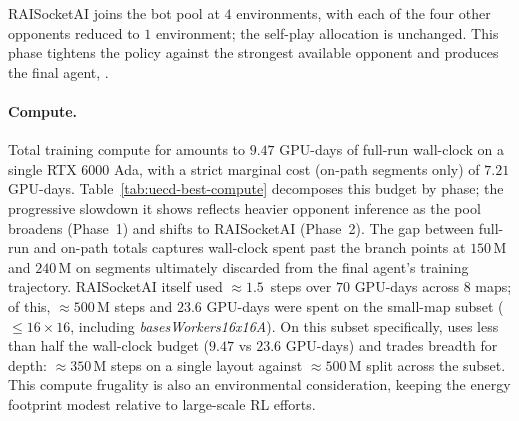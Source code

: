 RAISocketAI joins the bot pool at $4$ environments, with each of the four other opponents reduced to $1$ environment; the self-play allocation is unchanged. This phase tightens the policy against the strongest available opponent and produces the final agent, .

\paragraph{Compute.}

Total training compute for  amounts to $9.47$ GPU-days of full-run wall-clock on a single RTX 6000 Ada, with a strict marginal cost (on-path segments only) of $7.21$ GPU-days. Table~\ref{tab:uecd-best-compute} decomposes this budget by phase; the progressive slowdown it shows reflects heavier opponent inference as the pool broadens (Phase~1) and shifts to RAISocketAI (Phase~2). The gap between full-run and on-path totals captures wall-clock spent past the branch points at $150\,\text{M}$ and $240\,\text{M}$ on segments ultimately discarded from the final agent's training trajectory. RAISocketAI itself used ${\approx}1.5$\, steps over $70$ GPU-days across $8$ maps; of this, ${\approx}500\,\text{M}$ steps and $23.6$ GPU-days were spent on the small-map subset ($\le\!16{\times}16$, including \emph{basesWorkers16x16A}). On this subset specifically,  uses less than half the wall-clock budget ($9.47$ vs $23.6$ GPU-days) and trades breadth for depth: ${\approx}350\,\text{M}$ steps on a single layout against ${\approx}500\,\text{M}$ split across the subset. This compute frugality is also an environmental consideration, keeping the energy footprint modest relative to large-scale RL efforts.

